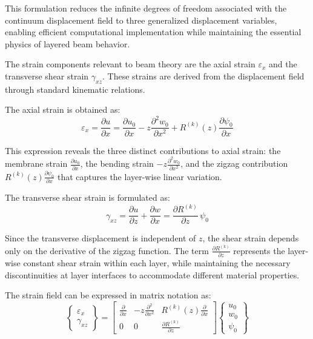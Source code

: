 \documentclass[12pt,a4paper]{report}
\begin{document}
This formulation reduces the infinite degrees of freedom associated with the continuum displacement field to three generalized displacement variables, enabling efficient computational implementation while maintaining the essential physics of layered beam behavior.

The strain components relevant to beam theory are the axial strain $\varepsilon_x$ and the transverse shear strain $\gamma_{xz}$. These strains are derived from the displacement field through standard kinematic relations.

The axial strain is obtained as:
\begin{equation}
\varepsilon_x = \frac{\partial u}{\partial x} 
= \frac{\partial u_0}{\partial x} 
- z \frac{\partial^2 w_0}{\partial x^2} 
+ R^{(k)}(z) \frac{\partial \psi_0}{\partial x}
\end{equation}

This expression reveals the three distinct contributions to axial strain: the membrane strain 
$\frac{\partial u_0}{\partial x}$, the bending strain 
$- z \frac{\partial^2 w_0}{\partial x^2}$, and the zigzag contribution 
$R^{(k)}(z) \frac{\partial \psi_0}{\partial x}$ that captures the layer-wise linear variation.

The transverse shear strain is formulated as:
\begin{equation}
\gamma_{xz} = \frac{\partial u}{\partial z} + \frac{\partial w}{\partial x} 
= \frac{\partial R^{(k)}}{\partial z} \, \psi_0 
\end{equation}

Since the transverse displacement is independent of $z$, the shear strain depends only on the derivative of the zigzag function. The term 
$\frac{\partial R^{(k)}}{\partial z}$ represents the layer-wise constant shear strain within each layer, while maintaining the necessary discontinuities at layer interfaces to accommodate different material properties.

The strain field can be expressed in matrix notation as:
\begin{equation}
\begin{Bmatrix} \varepsilon_x \\ \gamma_{xz} \end{Bmatrix} =
\begin{bmatrix} 
\frac{\partial}{\partial x} & -z \frac{\partial^2}{\partial x^2} & R^{(k)}(z) \frac{\partial}{\partial x} \\
0 & 0 & \frac{\partial R^{(k)}}{\partial z} 
\end{bmatrix}
\begin{Bmatrix} u_0 \\ w_0 \\ \psi_0 \end{Bmatrix}
\end{equation}
\end{document}
